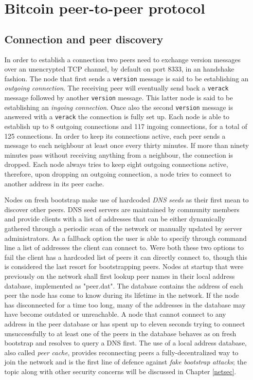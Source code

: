 \documentclass[12pt, letterpaper, twoside]{article}
\title{}
\author{}
\begin{document}
\maketitle

\section{Bitcoin peer-to-peer protocol}\label{netintro}
\subsection{Connection and peer discovery}\label{peerdisc}
In order to establish a connection two peers need to exchange version messages over an unencrypted TCP channel, by default on port 8333, in an handshake fashion. The node that first sends a \texttt{version} message is said to be establishing an \emph{outgoing connection}. The receiving peer will eventually send back a \texttt{verack} message followed by another \texttt{version} message. This latter node is said to be establishing an \emph{ingoing connection}. Once also the second \texttt{version} message is answered with a \texttt{verack} the connection is fully set up. Each node is able to establish up to 8 outgoing connections and 117 ingoing connections, for a total of 125 connections. In order to keep its connections active, each peer sends a message to each neighbour at least once every thirty minutes. If more than ninety minutes pass without receiving anything from a neighbour, the connection is dropped. Each node always tries to keep eight outgoing connections active, therefore, upon dropping an outgoing connection, a node tries to connect to another address in its peer cache.

Nodes on fresh bootstrap make use of hardcoded \emph{DNS seeds} as their first mean to discover other peers. DNS seed servers are maintained by community members and provide clients with a list of addresses that can be either dynamically gathered through a periodic scan of the network or manually updated by server administrators. As a fallback option the user is able to specify through command line a list of addresses the client can connect to. Were both these two options to fail the client has a hardcoded list of peers it can directly connect to, though this is considered the last resort for bootstrapping peers. Nodes at startup that were previously on the network shall first lookup peer names in their local address database, implemented as "peer.dat". The database contains the address of each peer the node has come to know during its lifetime in the network. If the node has disconnected for a time too long, many of the addresses in the database may have become outdated or unreachable. A node that cannot connect to any address in the peer database or has spent up to eleven seconds trying to connect unsuccessfully to at least one of the peers in the database behaves as on fresh bootstrap and resolves to query a DNS first. The use of a local address database, also called \emph{peer cache}, provides reconnecting peers a fully-decentralized way to join the network and is the first line of defence against \emph{fake bootstrap attacks}; the topic along with other security concerns will be discussed in Chapter \ref{netsec}.
\end{document}
